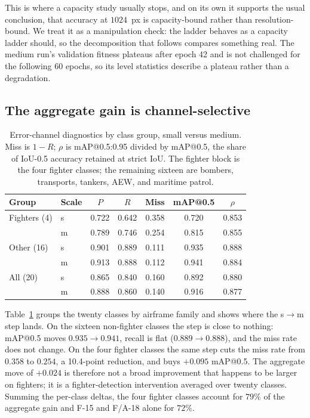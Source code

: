 \documentclass[conference]{IEEEtran}
\begin{document}
This is where a capacity study usually stops, and on its own it supports the
usual conclusion, that accuracy at $1024$~px is capacity-bound rather than
resolution-bound. We treat it as a manipulation check: the ladder behaves as a
capacity ladder should, so the decomposition that follows compares something
real. The medium run's validation fitness plateaus after epoch 42 and is not
challenged for the following 60 epochs, so its level statistics describe a
plateau rather than a degradation.

\subsection{The aggregate gain is channel-selective}

\begin{table}[t]
\centering
\caption{Error-channel diagnostics by class group, small versus medium. Miss is
$1-R$; $\rho$ is mAP@0.5:0.95 divided by mAP@0.5, the share of IoU-0.5 accuracy
retained at strict IoU. The fighter block is the four fighter classes; the
remaining sixteen are bombers, transports, tankers, AEW, and maritime patrol.}
\label{tab:channels}
\setlength{\tabcolsep}{4pt}
\footnotesize
\begin{tabular}{@{}llccccc@{}}
\toprule
Group & Scale & $P$ & $R$ & Miss & mAP@0.5 & $\rho$ \\
\midrule
Fighters (4) & s & 0.722 & 0.642 & 0.358 & 0.720 & 0.853 \\
             & m & 0.789 & 0.746 & 0.254 & 0.815 & 0.855 \\
\midrule
Other (16)   & s & 0.901 & 0.889 & 0.111 & 0.935 & 0.888 \\
             & m & 0.913 & 0.888 & 0.112 & 0.941 & 0.884 \\
\midrule
All (20)     & s & 0.865 & 0.840 & 0.160 & 0.892 & 0.880 \\
             & m & 0.888 & 0.860 & 0.140 & 0.916 & 0.877 \\
\bottomrule
\end{tabular}
\end{table}

Table~\ref{tab:channels} groups the twenty classes by airframe family and shows
where the s$\rightarrow$m step lands. On the sixteen non-fighter classes the
step is close to nothing: mAP@0.5 moves $0.935\rightarrow0.941$, recall is flat
($0.889\rightarrow0.888$), and the miss rate does not change. On the four
fighter classes the same step cuts the miss rate from $0.358$ to $0.254$, a
10.4-point reduction, and buys $+0.095$ mAP@0.5. The aggregate move of $+0.024$
is therefore not a broad improvement that happens to be larger on fighters; it
is a fighter-detection intervention averaged over twenty classes. Summing the
per-class deltas, the four fighter classes account for $79\%$ of the aggregate
gain and F-15 and F/A-18 alone for $72\%$.
\end{document}
